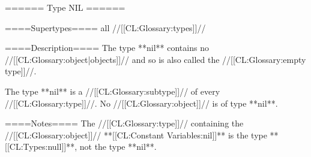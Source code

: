 ====== Type NIL ======

====Supertypes==== 
all //[[CL:Glossary:types]]//

====Description====
The type **nil** contains no //[[CL:Glossary:object|objects]]// and so is also called the //[[CL:Glossary:empty type]]//.

The type **nil** is a //[[CL:Glossary:subtype]]// of every //[[CL:Glossary:type]]//. No //[[CL:Glossary:object]]// is of type **nil**.

====Notes====
The //[[CL:Glossary:type]]// containing the //[[CL:Glossary:object]]// **[[CL:Constant Variables:nil]]** is the type **[[CL:Types:null]]**, not the type **nil**.

